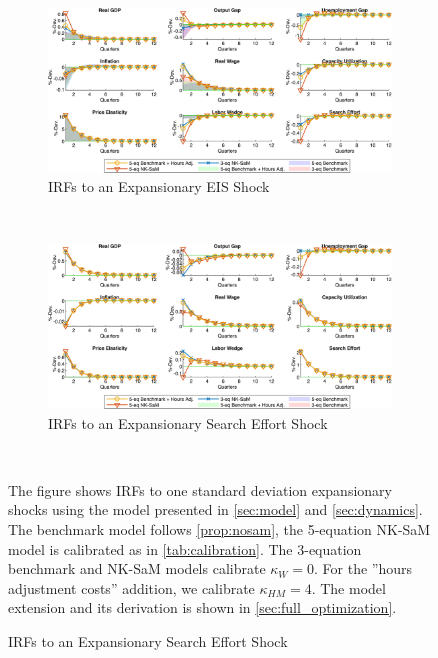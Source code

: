 \documentclass[12pt,3p,authoryear,review]{elsarticle}
\begin{document}
\begin{figure}[h!]%
    \centering%
    \caption{Sticky and Flexible Wages - IRFs to Expansionary Cost Push Shocks}\label{fig:app_irf_robust_sw_2}%
    \begin{subfigure}{\textwidth}%
        \centering%
        \caption{IRFs to an Expansionary EIS Shock}%
        \includegraphics[width=\textwidth]{fig_31_irf_robust_stickywage_eis.png}%
    \end{subfigure}\\%
	\vspace{0.2in}%
    \begin{subfigure}{\textwidth}%
        \centering%
        \caption{IRFs to an Expansionary Search Effort Shock}%
        \includegraphics[width=\textwidth]{fig_32_irf_robust_stickywage_search.png}%
    \end{subfigure}\\%
    {\tiny \singlespacing The figure shows IRFs to one standard deviation expansionary shocks using the model presented in \cref{sec:model} and \cref{sec:dynamics}. The benchmark model follows \cref{prop:nosam}, the 5-equation NK-SaM model is calibrated as in \cref{tab:calibration}. The 3-equation benchmark and NK-SaM models calibrate $\kappa_W=0$. For the ''hours adjustment costs'' addition, we calibrate $\kappa_{HM} = 4$. The model extension and its derivation is shown in \ref{sec:full_optimization}.\par}%
\end{figure}%
\FloatBarrier%
\pagebreak%
\end{document}
